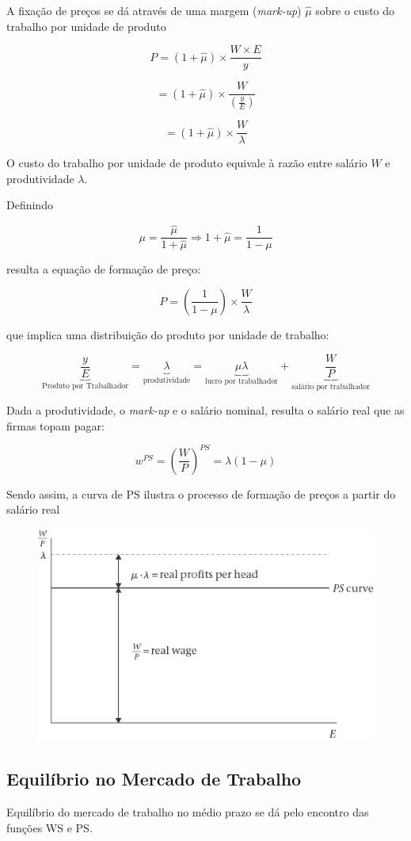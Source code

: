 \documentclass[a4paper,12pt]{article}[abntex2]
\begin{document}
A fixação de preços se dá através de uma margem (\textit{mark-up}) $\hat{\mu}$ sobre o custo do trabalho por unidade de produto

\[
P = (1 + \hat{\mu}) \times \frac{W \times E}{y}
\]

\[
= (1 + \hat{\mu}) \times \frac{W}{\left(\frac{y}{E}\right)}
\]

\[
= (1 + \hat{\mu}) \times \frac{W}{\lambda}
\]

O custo do trabalho por unidade de produto equivale à razão entre salário \( W \) e produtividade \( \lambda \).

Definindo 

\[
\mu = \frac{\hat{\mu}}{1 + \hat{\mu}} \Rightarrow 1 + \hat{\mu} = \frac{1}{1 - \mu}
\]

resulta a equação de formação de preço:

\[
P = \left(\frac{1}{1 - \mu}\right) \times \frac{W}{\lambda}
\]

que implica uma distribuição do produto por unidade de trabalho:

\[
\underbrace{\frac{y}{E}}_\text{Produto por Trabalhador} = \underbrace{\lambda}_\text{produtividade} = \underbrace{\mu \lambda}_\text{lucro por trabalhador} + \underbrace{\frac{W}{P}}_\text{salário por trabalhador}
\]


Dada a produtividade, o \textit{mark-up} e o salário nominal, resulta o salário real que as firmas topam pagar:

\[
w^{PS} = (\frac{W}{P})^{PS} = \lambda (1 - \mu)
\]

Sendo assim, a curva de PS ilustra o processo de formação de preços a partir do salário real

\begin{figure}[H]
    \centering
    \includegraphics[width=0.7\linewidth]{Imagens/a5i13.png}
\end{figure}


\subsection{\textbf{Equilíbrio no Mercado de Trabalho}}
Equilíbrio do mercado de trabalho no médio prazo se dá pelo encontro das funções WS e PS. 
\end{document}
